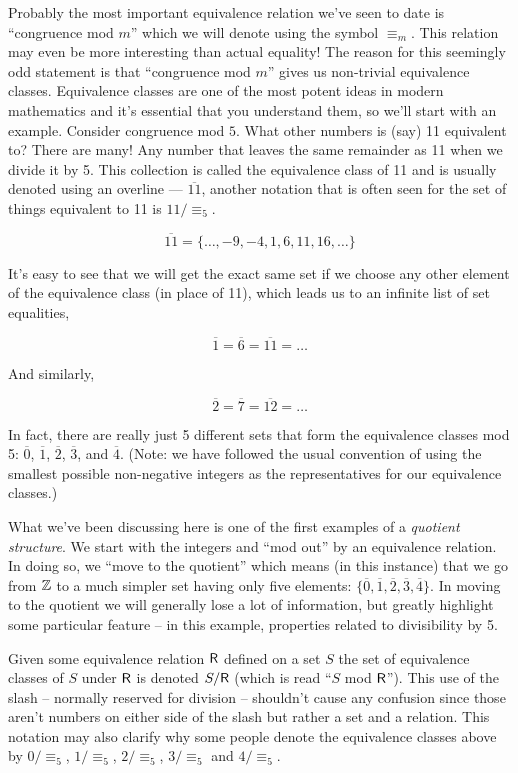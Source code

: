 Probably the most important equivalence relation we've seen to date
is ``congruence mod $m$'' which we will denote using the symbol $\equiv_m$.
This relation may even be more interesting than
actual equality!   The reason for this seemingly odd statement is that
``congruence mod $m$'' gives us non-trivial  equivalence classes.  Equivalence
classes are one of the most potent ideas in modern mathematics and it's essential
that you understand them, so we'll start with an example.  Consider congruence
mod $5$.  What other numbers is (say) 11 equivalent to?  There are many!  Any 
number that leaves the same remainder as 11 when we divide it by 5.  This collection
is called the equivalence class of 11 and is usually denoted using an overline --- 
$\overline{11}$, another notation that is often seen for the set of things equivalent 
to 11 is $11/\equiv_5$. 

\[ \overline{11} = \{ \ldots, -9, -4, 1, 6, 11, 16, \ldots \} \]

It's easy to see that we will get the exact same set if we choose any other element
of the equivalence class (in place of 11), which leads us to an infinite list of set
equalities,

\[   \overline{1} = \overline{6} = \overline{11} = \ldots \]

\noindent And similarly, 

\[   \overline{2} = \overline{7} = \overline{12} = \ldots \]

\noindent In fact, there are really just 5 different sets that form the
equivalence classes mod 5:  $\overline{0}$, $\overline{1}$, $\overline{2}$, $\overline{3}$, 
and $\overline{4}$.  (Note: we have followed the usual convention of using the smallest
 possible non-negative integers as the representatives for our equivalence classes.)

What we've been discussing here is one of the first examples of a 
\emph{quotient structure}.
We start with the integers and ``mod out'' by an equivalence relation.  In doing so, we
``move to the quotient'' which means (in this instance) that we go from ${\mathbb Z}$ to a much simpler set
having only five elements: $\{ \overline{0}, \overline{1}, \overline{2}, \overline{3}, 
\overline{4} \}$.  In moving to the quotient we will generally lose a lot of information, 
but greatly highlight some particular feature -- in this example, properties related to 
divisibility by 5.
 
Given some equivalence relation $\mbox{\textsf R}$ defined on a set $S$ the set of equivalence classes
of $S$ under $\mbox{\textsf R}$ is denoted $S/\mbox{\textsf R}$ (which is read ``$S$ mod $\mbox{\textsf R}$'').  This use of the
slash -- normally reserved for division -- shouldn't cause any confusion since those aren't 
numbers on either side of the slash but rather a set and a relation.  This
notation may also clarify why some people denote the equivalence classes above
by $0/\equiv_5$, $1/\equiv_5$, $2/\equiv_5$, $3/\equiv_5$ and  $4/\equiv_5$.
 
